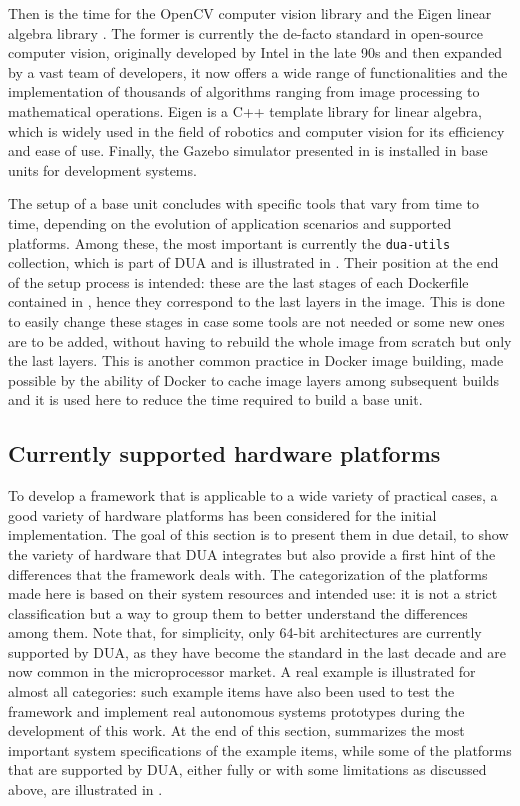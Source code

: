 Then is the time for the OpenCV computer vision library \cite{opencv_team_opencv_nodate,culjak_brief_2012} and the Eigen linear algebra library \cite{jacob_eigen_nodate}. The former is currently the de-facto standard in open-source computer vision, originally developed by Intel in the late 90s and then expanded by a vast team of developers, it now offers a wide range of functionalities and the implementation of thousands of algorithms ranging from image processing to mathematical operations. Eigen is a C++ template library for linear algebra, which is widely used in the field of robotics and computer vision for its efficiency and ease of use. Finally, the Gazebo simulator presented in  is installed in base units for development systems.

The setup of a base unit concludes with specific tools that vary from time to time, depending on the evolution of application scenarios and supported platforms. Among these, the most important is currently the \texttt{dua-utils} collection, which is part of DUA and is illustrated in . Their position at the end of the setup process is intended: these are the last stages of each Dockerfile contained in \cite{masocco_dua-foundation_nodate}, hence they correspond to the last layers in the image. This is done to easily change these stages in case some tools are not needed or some new ones are to be added, without having to rebuild the whole image from scratch but only the last layers. This is another common practice in Docker image building, made possible by the ability of Docker to cache image layers among subsequent builds and it is used here to reduce the time required to build a base unit.

\subsection{Currently supported hardware platforms}
\label{sec:dua_supported_platforms}
To develop a framework that is applicable to a wide variety of practical cases, a good variety of hardware platforms has been considered for the initial implementation. The goal of this section is to present them in due detail, to show the variety of hardware that DUA integrates but also provide a first hint of the differences that the framework deals with. The categorization of the platforms made here is based on their system resources and intended use: it is not a strict classification but a way to group them to better understand the differences among them. Note that, for simplicity, only 64-bit architectures are currently supported by DUA, as they have become the standard in the last decade and are now common in the microprocessor market. A real example is illustrated for almost all categories: such example items have also been used to test the framework and implement real autonomous systems prototypes during the development of this work. At the end of this section,  summarizes the most important system specifications of the example items, while some of the platforms that are supported by DUA, either fully or with some limitations as discussed above, are illustrated in .

